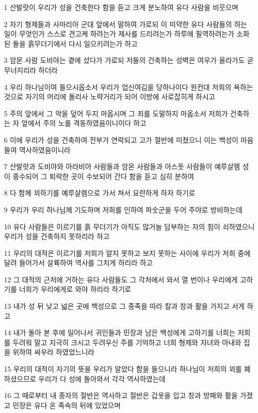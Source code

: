 \par 1 산발랏이 우리가 성을 건축한다 함을 듣고 크게 분노하여 유다 사람을 비웃으며
\par 2 자기 형제들과 사마리아 군대 앞에서 말하여 가로되 이 미약한 유다 사람들의 하는 일이 무엇인가 스스로 견고케 하려는가 제사를 드리려는가 하루에 필역하려는가 소화된 돌을 흙무더기에서 다시 일으키려는가 하고
\par 3 암몬 사람 도비야는 곁에 섰다가 가로되 저들의 건축하는 성벽은 여우가 올라가도 곧 무너지리라 하더라
\par 4 우리 하나님이여 들으시옵소서 우리가 업신여김을 당하나이다 원컨대 저희의 욕하는 것으로 자기의 머리에 돌리사 노략거리가 되어 이방에 사로잡히게 하시고
\par 5 주의 앞에서 그 악을 덮어 두지 마옵시며 그 죄를 도말하지 마옵소서 저희가 건축하는 자 앞에서 주의 노를 격동하였음이니이다 하고
\par 6 이에 우리가 성을 건축하여 전부가 연락되고 고가 절반에 미쳤으니 이는 백성이 마음들여 역사하였음이니라
\par 7 산발랏과 도비야와 아라비아 사람들과 암몬 사람들과 아스돗 사람들이 예루살렘 성이 중수되어 그 퇴락한 곳이 수보되어 간다 함을 듣고 심히 분하여
\par 8 다 함께 꾀하기를 예루살렘으로 가서 쳐서 요란하게 하자 하기로
\par 9 우리가 우리 하나님께 기도하며 저희를 인하여 파숫군을 두어 주야로 방비하는데
\par 10 유다 사람들은 이르기를 흙 무더기가 아직도 많거늘 담부하는 자의 힘이 쇠하였으니 우리가 성을 건축하지 못하리라 하고
\par 11 우리의 대적은 이르기를 저희가 알지 못하고 보지 못하는 사이에 우리가 저희 중에 달려 들어가서 살륙하여 역사를 그치게 하리라 하고
\par 12 그 대적의 근처에 거하는 유다 사람들도 그 각처에서 와서 열 번이나 우리에게 고하기를 너희가 우리에게로 와야 하리라 하기로
\par 13 내가 성 뒤 낮고 넓은 곳에 백성으로 그 종족을 따라 칼과 창과 활을 가지고 서게 하고
\par 14 내가 돌아 본 후에 일어나서 귀인들과 민장과 남은 백성에게 고하기를 너희는 저희를 두려워 말고 지극히 크시고 두려우신 주를 기억하고 너희 형제와 자녀와 아내와 집을 위하여 싸우라 하였었느니라
\par 15 우리의 대적이 자기의 뜻을 우리가 알았다 함을 들으니라 하나님이 저희의 꾀를 폐하셨으므로 우리가 다 성에 돌아와서 각각 역사하였는데
\par 16 그 때로부터 내 종자의 절반은 역사하고 절반은 갑옷을 입고 창과 방패와 활을 가졌고 민장은 유다 온 족속의 뒤에 있었으며
